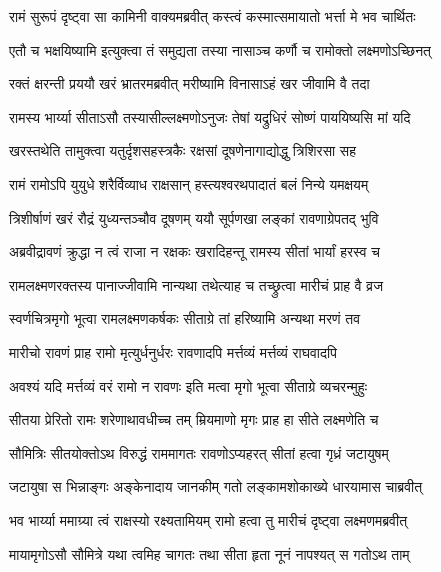 \twolineshloka
{रामं सुरूपं दृष्ट्वा सा कामिनी वाक्यमब्रवीत्}
{कस्त्वं कस्मात्समायातो भर्त्ता मे भव चार्थितः}%

\twolineshloka
{एतौ च भक्षयिष्यामि इत्युक्त्वा तं समुद्यता }
{तस्या नासाञ्च कर्णौ च रामोक्तो लक्ष्मणोऽच्छिनत्}%

\twolineshloka
{रक्तं क्षरन्ती प्रययौ खरं भ्रातरमब्रवीत्}
{मरीष्यामि विनासाऽहं खर जीवामि वै तदा}%

\twolineshloka
{रामस्य भार्य्या सीताऽसौ तस्यासील्लक्ष्मणोऽनुजः}
{तेषां यद्रुधिरं सोष्णं पाययिष्यसि मां यदि}%

\twolineshloka
{खरस्तथेति तामुक्त्वा यतुर्दृशसहस्त्रकैः}
{रक्षसां दूषणेनागाद्योद्धु त्रिशिरसा सह}%

\twolineshloka
{रामं रामोऽपि युयुधे शरैर्विव्याध राक्षसान्}
{हस्त्यश्वरथपादातं बलं निन्ये यमक्षयम्}%

\twolineshloka
{त्रिशीर्षाणं खरं रौद्रं युध्यन्तञ्चौव दूषणम्}
{ययौ सूर्पणखा लङ्कां रावणाग्रेपतद् भुवि}%

\twolineshloka
{अब्रवीद्रावणं क्रुद्धा न त्वं राजा न रक्षकः}
{खरादिहन्तू रामस्य सीतां भार्यां हरस्व च}%

\twolineshloka
{रामलक्ष्मणरक्तस्य पानाज्जीवामि नान्यथा}
{तथेत्याह च तच्छ्रुत्वा मारीचं प्राह वै व्रज}%

\twolineshloka
{स्वर्णचित्रमृगो भूत्वा रामलक्ष्मणकर्षकः}
{सीताग्रे तां हरिष्यामि अन्यथा मरणं तव}%

\twolineshloka
{मारीचो रावणं प्राह रामो मृत्युर्धनुर्धरः}
{रावणादपि मर्त्तव्यं मर्त्तव्यं राघवादपि}%

\twolineshloka
{अवश्यं यदि मर्त्तव्यं वरं रामो न रावणः}
{इति मत्वा मृगो भूत्वा सीताग्रे व्यचरन्मुहुः}%

\twolineshloka
{सीतया प्रेरितो रामः शरेणाथावधीच्च तम्}
{म्रियमाणो मृगः प्राह हा सीते लक्ष्मणेति च}%

\twolineshloka
{सौमित्रिः सीतयोक्तोऽथ विरुद्धं राममागतः}
{रावणोऽप्यहरत् सीतां हत्वा गृध्रं जटायुषम्}%

\twolineshloka
{जटायुषा स भिन्नाङ्गः अङ्केनादाय जानकीम्}
{गतो लङ्कामशोकाख्ये धारयामास चाब्रवीत्}%

\twolineshloka
{भव भार्य्या ममाग्र्या त्वं राक्षस्यो रक्ष्यतामियम् }
{रामो हत्वा तु मारीचं दृष्ट्वा लक्ष्मणमब्रवीत्}%

\twolineshloka
{मायामृगोऽसौ सौमित्रे यथा त्वमिह चागतः }
{तथा सीता हृता नूनं नापश्यत् स गतोऽथ ताम्}%

